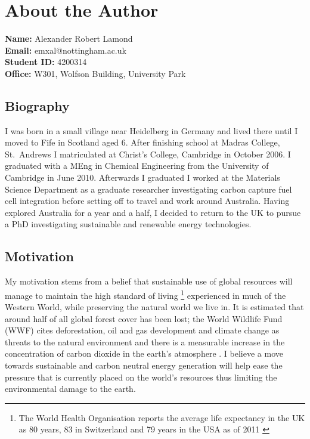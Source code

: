 \chapter*{About the Author} %

\textbf{Name:} Alexander Robert Lamond \\
\textbf{Email:} emxal@nottingham.ac.uk \\
\textbf{Student ID:} 4200314 \\
\textbf{Office:} W301, Wolfson Building, University Park

\Envelope
\Phone


\section*{Biography}
I was born in a small village near Heidelberg in Germany and lived there until I moved to Fife in Scotland aged 6.
After finishing school at Madras College, St.\ Andrews I matriculated at Christ's College, Cambridge in October 2006.
I graduated with a MEng in Chemical Engineering from the University of Cambridge in June 2010.
Afterwards I graduated I worked at the Materials Science Department as a graduate researcher investigating carbon capture fuel cell integration before setting off to travel  and work around Australia.
Having explored Australia for a year and a half, I decided to return to the UK to pursue a PhD investigating sustainable and renewable energy technologies. 

\section*{Motivation}
My motivation stems from a belief that sustainable use of global resources will manage to maintain the high standard of living 
	\footnote{The World Health Organisation reports the average life expectancy in the UK as 80 years, 83 in Switzerland and 79 years in the USA as of 2011 \cite{WHOstat2013}} 
experienced in much of the Western World, while preserving the natural world we live in. 
It is estimated that around half of all global forest cover has been lost; the World Wildlife Fund (WWF) cites deforestation, oil and gas development and climate change as threats to the natural environment and there is a measurable increase in the concentration of carbon dioxide in the earth's atmosphere \cite{Laurance2010, WWF, CO2trend}. 
I believe a move towards sustainable and carbon neutral energy generation will help ease the pressure that is currently placed on the world's resources thus limiting the environmental damage to the earth.